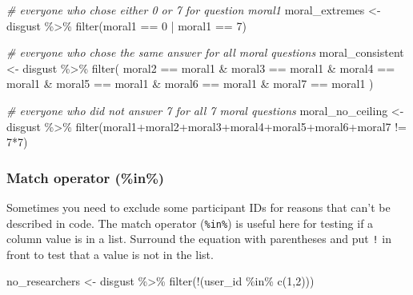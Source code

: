 \documentclass[
  oneside]{book}
\newenvironment{Shaded}{\begin{snugshade}}{\end{snugshade}}
\newcommand{\CommentTok}[1]{\textcolor[rgb]{0.56,0.35,0.01}{\textit{#1}}}
\newcommand{\DecValTok}[1]{\textcolor[rgb]{0.00,0.00,0.81}{#1}}
\newcommand{\FunctionTok}[1]{\textcolor[rgb]{0.00,0.00,0.00}{#1}}
\newcommand{\NormalTok}[1]{#1}
\newcommand{\OtherTok}[1]{\textcolor[rgb]{0.56,0.35,0.01}{#1}}
\newcommand{\SpecialCharTok}[1]{\textcolor[rgb]{0.00,0.00,0.00}{#1}}
\begin{document}
\begin{Shaded}
\begin{Highlighting}[]
\CommentTok{\# everyone who chose either 0 or 7 for question moral1}
\NormalTok{moral\_extremes }\OtherTok{\textless{}{-}}\NormalTok{ disgust }\SpecialCharTok{\%\textgreater{}\%} 
  \FunctionTok{filter}\NormalTok{(moral1 }\SpecialCharTok{==} \DecValTok{0} \SpecialCharTok{|}\NormalTok{ moral1 }\SpecialCharTok{==} \DecValTok{7}\NormalTok{)}

\CommentTok{\# everyone who chose the same answer for all moral questions}
\NormalTok{moral\_consistent }\OtherTok{\textless{}{-}}\NormalTok{ disgust }\SpecialCharTok{\%\textgreater{}\%} 
  \FunctionTok{filter}\NormalTok{(}
\NormalTok{    moral2 }\SpecialCharTok{==}\NormalTok{ moral1 }\SpecialCharTok{\&} 
\NormalTok{    moral3 }\SpecialCharTok{==}\NormalTok{ moral1 }\SpecialCharTok{\&} 
\NormalTok{    moral4 }\SpecialCharTok{==}\NormalTok{ moral1 }\SpecialCharTok{\&}
\NormalTok{    moral5 }\SpecialCharTok{==}\NormalTok{ moral1 }\SpecialCharTok{\&}
\NormalTok{    moral6 }\SpecialCharTok{==}\NormalTok{ moral1 }\SpecialCharTok{\&}
\NormalTok{    moral7 }\SpecialCharTok{==}\NormalTok{ moral1}
\NormalTok{  )}

\CommentTok{\# everyone who did not answer 7 for all 7 moral questions}
\NormalTok{moral\_no\_ceiling }\OtherTok{\textless{}{-}}\NormalTok{ disgust }\SpecialCharTok{\%\textgreater{}\%}
  \FunctionTok{filter}\NormalTok{(moral1}\SpecialCharTok{+}\NormalTok{moral2}\SpecialCharTok{+}\NormalTok{moral3}\SpecialCharTok{+}\NormalTok{moral4}\SpecialCharTok{+}\NormalTok{moral5}\SpecialCharTok{+}\NormalTok{moral6}\SpecialCharTok{+}\NormalTok{moral7 }\SpecialCharTok{!=} \DecValTok{7}\SpecialCharTok{*}\DecValTok{7}\NormalTok{)}
\end{Highlighting}
\end{Shaded}

\hypertarget{match-operator}{%
\subsubsection{Match operator (\%in\%)}\label{match-operator}}

Sometimes you need to exclude some participant IDs for reasons that can't be described in code. The match operator (\texttt{\%in\%}) is useful here for testing if a column value is in a list. Surround the equation with parentheses and put \texttt{!} in front to test that a value is not in the list.

\begin{Shaded}
\begin{Highlighting}[]
\NormalTok{no\_researchers }\OtherTok{\textless{}{-}}\NormalTok{ disgust }\SpecialCharTok{\%\textgreater{}\%}
  \FunctionTok{filter}\NormalTok{(}\SpecialCharTok{!}\NormalTok{(user\_id }\SpecialCharTok{\%in\%} \FunctionTok{c}\NormalTok{(}\DecValTok{1}\NormalTok{,}\DecValTok{2}\NormalTok{)))}
\end{Highlighting}
\end{Shaded}
\end{document}
